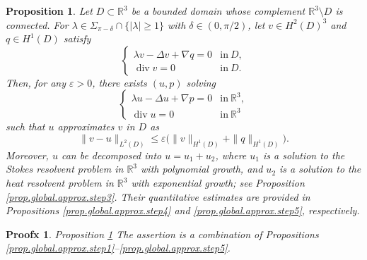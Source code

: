 \documentclass[10pt,a4paper]{amsart}
\newtheorem{proposition}{Proposition}
\newtheorem{proofx}{Proofx}
\newcommand{\R}{\mathbb{R}}
\newcommand{\eps}{\varepsilon}
\newcommand{\opdiv}{\operatorname{div}}
\begin{document}
\begin{proposition}\label{prop.global.approx}
Let $D \subset \R^3$ be a bounded domain whose complement $\R^3\setminus D$ is connected. For $\lambda\in \Sigma_{\pi-\delta} \cap \{|\lambda| \ge 1\}$ with $\delta\in(0,\pi/2)$, let $v\in H^2(D)^3$ and $q\in H^1(D)$ satisfy
\[
    \left\{
    \begin{array}{ll}
    \lambda v - \Delta v + \nabla q
    = 0&\mbox{in}\ D, \\
    \opdiv v
    = 0&\mbox{in}\ D. 
    \end{array}\right.
\]
Then, for any $\eps>0$, there exists $(u,p)$ solving 
\[
    \left\{
    \begin{array}{ll}
    \lambda u - \Delta u + \nabla p
    = 0&\mbox{in}\ \R^3, \\
    \opdiv u
    = 0&\mbox{in}\ \R^3 
    \end{array}\right.
\]
such that $u$ approximates $v$ in $D$ as 
\[
    \|v - u\|_{L^2(D)} 
    \le 
    \eps 
    \Big( \|v\|_{H^{1}(D)} + \|q\|_{H^{1}(D)} \Big). 
\]
Moreover, $u$ can be decomposed into $u = u_1 + u_2$, where $u_1$ is a solution to the Stokes resolvent problem in $\R^3$ with polynomial growth, and $u_2$ is a solution to the heat resolvent problem in $\R^3$ with exponential growth; see Proposition \ref{prop.global.approx.step3}. Their quantitative estimates are provided in Propositions \ref{prop.global.approx.step4} and \ref{prop.global.approx.step5}, respectively.
\end{proposition}

\begin{proofx}{Proposition \ref{prop.global.approx}}
The assertion is a combination of Propositions \ref{prop.global.approx.step1}--\ref{prop.global.approx.step5}. 
\end{proofx}
\end{document}
